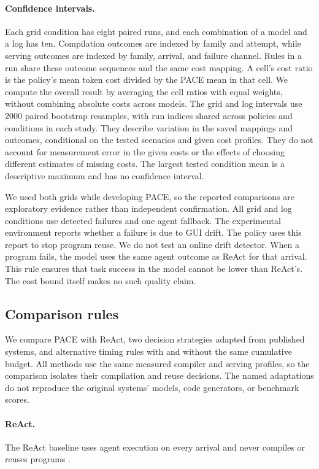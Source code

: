 \paragraph{Confidence intervals.}
Each grid condition has eight paired runs, and each combination of a model and a log has ten.
Compilation outcomes are indexed by family and attempt, while serving outcomes are indexed by family, arrival, and failure channel.
Rules in a run share these outcome sequences and the same cost mapping.
A cell's cost ratio is the policy's mean token cost divided by the PACE mean in that cell.
We compute the overall result by averaging the cell ratios with equal weights, without combining absolute costs across models.
The grid and log intervals use $2000$ paired bootstrap resamples, with run indices shared across policies and conditions in each study.
They describe variation in the saved mappings and outcomes, conditional on the tested scenarios and given cost profiles.
They do not account for measurement error in the given costs or the effects of choosing different estimates of missing costs.
The largest tested condition mean is a descriptive maximum and has no confidence interval.

We used both grids while developing PACE, so the reported comparisons are exploratory evidence rather than independent confirmation.
All grid and log conditions use detected failures and one agent fallback.
The experimental environment reports whether a failure is due to GUI drift.
The policy uses this report to stop program reuse.
We do not test an online drift detector.
When a program fails, the model uses the same agent outcome as ReAct for that arrival.
This rule ensures that task success in the model cannot be lower than ReAct's.
The cost bound itself makes no such quality claim.

\subsection{Comparison rules}\label{app:baselines}
\label{sec:baselines}

We compare PACE with ReAct, two decision strategies adapted from published systems, and alternative timing rules with and without the same cumulative budget.
All methods use the same measured compiler and serving profiles, so the comparison isolates their compilation and reuse decisions.
The named adaptations do not reproduce the original systems' models, code generators, or benchmark scores.

\paragraph{ReAct.}
The ReAct baseline uses agent execution on every arrival and never compiles or reuses programs \citep{yao2023react}.

